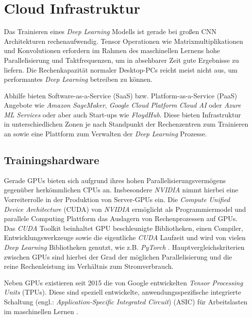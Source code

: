 \section{Cloud Infrastruktur} \label{cloud}

Das Trainieren eines \textit{Deep Learning} Modells ist gerade bei großen CNN Architekturen rechenaufwendig. Tensor Operationen wie Matrixmultiplikationen und Konvolutionen erfordern im Rahmen des maschinellen Lernens hohe Parallelisierung und Taktfrequenzen, um in absehbarer Zeit gute Ergebnisse zu liefern. Die Rechenkapazität normaler Desktop-PCs reicht meist nicht aus, um performantes \textit{Deep Learning} betreiben zu können. 

Abhilfe bieten Software-as-a-Service (SaaS) bzw. Platform-as-a-Service (PaaS) Angebote wie \textit{Amazon SageMaker}, \textit{Google Cloud Platform Cloud AI} oder \textit{Azure ML Services} oder aber auch Start-ups wie \textit{FloydHub}. Diese bieten Infrastruktur in unterschiedlichen Zonen je nach Standpunkt der Rechenzentren zum Trainieren an sowie eine Plattform zum Verwalten der \textit{Deep Learning} Prozesse. 

\subsection*{Trainingshardware}

Gerade GPUs bieten sich aufgrund ihres hohen Parallelisierungsvermögens gegenüber herkömmlichen CPUs an. Insbesondere \textit{NVIDIA} nimmt hierbei eine Vorreiterrolle in der Produktion von Server-GPUs ein. Die \textit{Compute Unified Device Architecture} (CUDA) von \textit{NVIDIA} ermöglicht als Programmiermodel und parallele Computing Plattform das Auslagern von Rechenprozessen auf GPUs. Das \textit{CUDA} Toolkit beinhaltet GPU beschleunigte Bibliotheken, einen Compiler, Entwicklungswerkzeuge sowie die eigentliche \textit{CUDA} Laufzeit und wird von vielen \textit{Deep Learning} Bibliotheken genutzt, wie z.B. \textit{PyTorch} \cite{NVIDIA.20200209, PyTorch.20200209}. Hauptvergleichskriterien zwischen GPUs sind hierbei der Grad der möglichen Parallelisierung und die reine Rechenleistung im Verhältnis zum Stromverbrauch.

Neben GPUs existieren seit 2015 die von Google entwickelten \textit{Tensor Processing Units} (TPUs). Diese sind speziell entwickelte, anwendungsspezifische integrierte Schaltung (engl.: \textit{Application-Specific Integrated Circuit}) (ASIC) für Arbeitslasten im maschinellen Lernen \cite{GoogleCloud.20200209b}.

